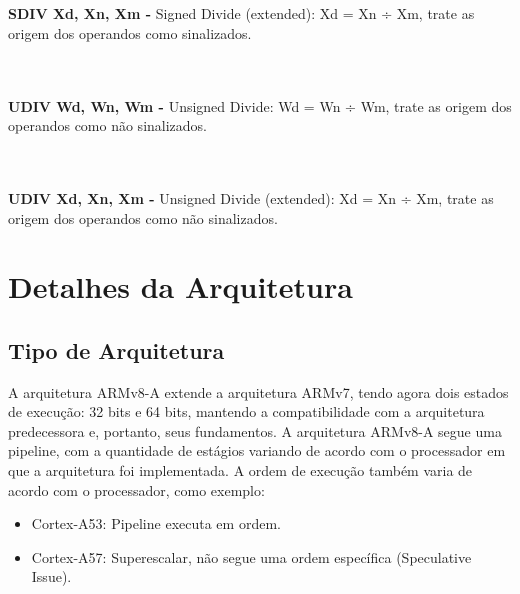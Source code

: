 \documentclass[12pt,a4paper,utf8]{ppgsi}
\begin{document}
\\\\\textbf{SDIV Xd, Xn, Xm -} Signed Divide (extended): Xd = Xn ÷ Xm, trate as origem dos operandos como sinalizados. 

\\\\\textbf{UDIV Wd, Wn, Wm -} Unsigned Divide: Wd = Wn ÷ Wm, trate as origem dos operandos como não sinalizados.

\\\\\textbf{UDIV Xd, Xn, Xm -} Unsigned Divide (extended): Xd = Xn ÷ Xm, trate as origem dos operandos como não sinalizados.

\section{Detalhes da Arquitetura}
    \subsection{Tipo de Arquitetura}
        A arquitetura ARMv8-A extende a arquitetura ARMv7, tendo agora dois estados de execução: 32 bits e 64 bits, mantendo a compatibilidade com a arquitetura predecessora e, portanto, seus fundamentos.
        A arquitetura ARMv8-A segue uma pipeline, com a quantidade de estágios variando de acordo com o processador em que a arquitetura foi implementada. A ordem de execução também varia de acordo com o processador, como exemplo:
        \begin{itemize}
            \item Cortex-A53: Pipeline executa em ordem.
        \end{itemize}
        \begin{itemize}
            \item Cortex-A57: Superescalar, não segue uma ordem específica (Speculative Issue).
        \end{itemize}
\end{document}
